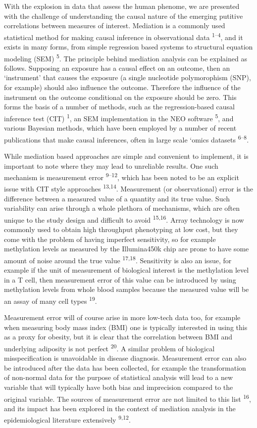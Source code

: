 \documentclass[]{article}
\begin{document}
With the explosion in data that assess the human phenome, we are
presented with the challenge of understanding the causal nature of the
emerging putitive correlations between measures of interest. Mediation
is a commonly used statistical method for making causal inference in
observational data \textsuperscript{1--4}, and it exists in many forms,
from simple regression based systems to structural equation modeling
(SEM) \textsuperscript{5}. The principle behind mediation analysis can
be explained as follows. Supposing an exposure has a causal effect on an
outcome, then an `instrument' that causes the exposure (a single
nucleotide polymorophism (SNP), for example) should also influence the
outcome. Therefore the influence of the instrument on the outcome
conditional on the exposure should be zero. This forms the basis of a
number of methods, such as the regression-based causal inference test
(CIT) \textsuperscript{1}, an SEM implementation in the NEO software
\textsuperscript{5}, and various Bayesian methods, which have been
employed by a number of recent publications that make causal inferences,
often in large scale `omics datasets \textsuperscript{6--8}.

While mediation based approaches are simple and convenient to implement,
it is important to note where they may lead to unreliable results. One
such mechanism is measurement error \textsuperscript{9--12}, which has
been noted to be an explicit issue with CIT style approaches
\textsuperscript{13,14}. Measurement (or observational) error is the
difference between a measured value of a quantity and its true value.
Such variability can arise through a whole plethora of mechanisms, which
are often unique to the study design and difficult to avoid
\textsuperscript{15,16}. Array technology is now commonly used to obtain
high throughput phenotyping at low cost, but they come with the problem
of having imperfect sensitivity, so for example methylation levels as
measured by the Illumina450k chip are prone to have some amount of noise
around the true value \textsuperscript{17,18}. Sensitivity is also an
issue, for example if the unit of measurement of biological interest is
the methylation level in a T cell, then measurement error of this value
can be introduced by using methylation levels from whole blood samples
because the measured value will be an assay of many cell types
\textsuperscript{19}.

Measurement error will of course arise in more low-tech data too, for
example when measuring body mass index (BMI) one is typically interested
in using this as a proxy for obesity, but it is clear that the
correlation between BMI and underlying adiposity is not perfect
\textsuperscript{20}. A similar problem of biological misspecification
is unavoidable in disease diagnosis. Measurement error can also be
introduced after the data has been collected, for example the
transformation of non-normal data for the purpose of statistical
analysis will lead to a new variable that will typically have both bias
and imprecision compared to the original variable. The sources of
measurement error are not limited to this list \textsuperscript{16}, and
its impact has been explored in the context of mediation analysis in the
epidemiological literature extensively \textsuperscript{9,12}.
\end{document}
